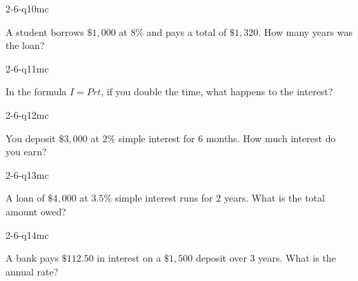 \begin{practiceQuestion}{2-6-q10}{mc}
\begin{questionText}
A student borrows $\$1{,}000$ at $8\%$ and pays a total of $\$1{,}320$. How many years was the loan?
\end{questionText}
\end{practiceQuestion}

\begin{practiceQuestion}{2-6-q11}{mc}
\begin{questionText}
In the formula $I = Prt$, if you double the time, what happens to the interest?
\end{questionText}
\end{practiceQuestion}

\begin{practiceQuestion}{2-6-q12}{mc}
\begin{questionText}
You deposit $\$3{,}000$ at $2\%$ simple interest for $6$ months. How much interest do you earn?
\end{questionText}
\end{practiceQuestion}

\begin{practiceQuestion}{2-6-q13}{mc}
\begin{questionText}
A loan of $\$4{,}000$ at $3.5\%$ simple interest runs for $2$ years. What is the total amount owed?
\end{questionText}
\end{practiceQuestion}

\begin{practiceQuestion}{2-6-q14}{mc}
\begin{questionText}
A bank pays $\$112.50$ in interest on a $\$1{,}500$ deposit over $3$ years. What is the annual rate?
\end{questionText}
\end{practiceQuestion}

